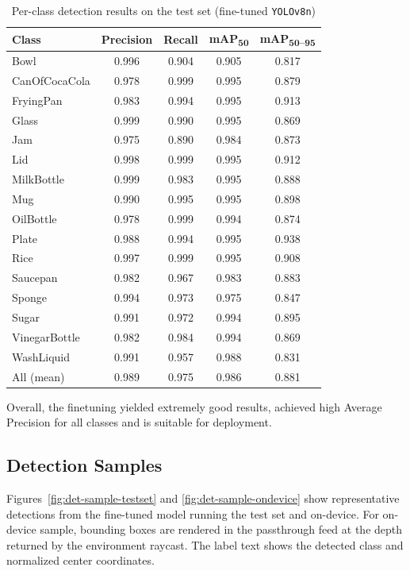 \documentclass{article}
\begin{document}
\begin{table}[H]
\centering
\begin{tabular}{lcccc}
\toprule
\textbf{Class} & \textbf{Precision} & \textbf{Recall} &
\textbf{mAP\textsubscript{50}} & \textbf{mAP\textsubscript{50--95}} \\
\midrule
Bowl           & 0.996 & 0.904 & 0.905 & 0.817 \\
CanOfCocaCola  & 0.978 & 0.999 & 0.995 & 0.879 \\
FryingPan      & 0.983 & 0.994 & 0.995 & 0.913 \\
Glass          & 0.999 & 0.990 & 0.995 & 0.869 \\
Jam            & 0.975 & 0.890 & 0.984 & 0.873 \\
Lid            & 0.998 & 0.999 & 0.995 & 0.912 \\
MilkBottle     & 0.999 & 0.983 & 0.995 & 0.888 \\
Mug            & 0.990 & 0.995 & 0.995 & 0.898 \\
OilBottle      & 0.978 & 0.999 & 0.994 & 0.874 \\
Plate          & 0.988 & 0.994 & 0.995 & 0.938 \\
Rice           & 0.997 & 0.999 & 0.995 & 0.908 \\
Saucepan       & 0.982 & 0.967 & 0.983 & 0.883 \\
Sponge         & 0.994 & 0.973 & 0.975 & 0.847 \\
Sugar          & 0.991 & 0.972 & 0.994 & 0.895 \\
VinegarBottle  & 0.982 & 0.984 & 0.994 & 0.869 \\
WashLiquid     & 0.991 & 0.957 & 0.988 & 0.831 \\
\midrule
All (mean)     & 0.989 & 0.975 & 0.986 & 0.881 \\
\bottomrule
\end{tabular}
\caption{Per-class detection results on the test set (fine-tuned \texttt{YOLOv8n})}
\label{tab:det-finetune-results}
\end{table}

Overall, the finetuning yielded extremely good results, achieved high Average Precision for all classes and is suitable for deployment.

\subsection{Detection Samples}
\label{sec:det-samples}

Figures~\ref{fig:det-sample-testset} and \ref{fig:det-sample-ondevice} show representative
detections from the fine-tuned model running the test set and on-device. For on-device sample, bounding boxes are rendered in the passthrough feed at the depth returned by the
environment raycast. The label text shows the detected class and normalized center coordinates.
\end{document}
